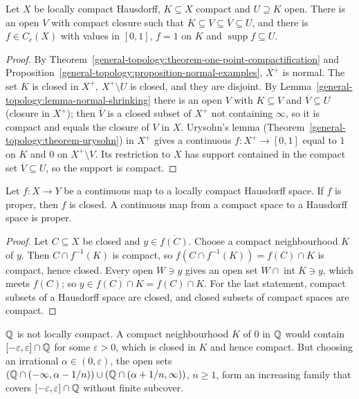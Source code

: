 \begin{lemma}\label{general-topology:lemma-lch-shrinking}
Let $X$ be locally compact Hausdorff, $K \subseteq X$ compact and $U \supseteq K$ open. There is an open $V$ with compact closure such that
$K \subseteq V \subseteq \overline{V} \subseteq U$, and there is $f \in C_c(X)$ with values in $[0, 1]$, $f = 1$ on $K$ and $\operatorname{supp} f \subseteq U$.
\end{lemma}

\begin{proof}
By Theorem~\ref{general-topology:theorem-one-point-compactification} and Proposition~\ref{general-topology:proposition-normal-examples}, $X^+$ is
normal. The set $K$ is closed in $X^+$, $X^+ \setminus U$ is closed, and they are disjoint. By Lemma~\ref{general-topology:lemma-normal-shrinking} there is an
open $V$ with $K \subseteq V$ and $\overline{V} \subseteq U$ (closure in $X^+$); then $\overline{V}$ is a closed subset of $X^+$ not containing $\infty$, so it
is compact and equals the closure of $V$ in $X$. Urysohn's lemma (Theorem~\ref{general-topology:theorem-urysohn}) in $X^+$ gives a continuous
$f \colon X^+ \to [0, 1]$ equal to $1$ on $K$ and $0$ on $X^+ \setminus V$. Its restriction to $X$ has support contained in the compact set $\overline{V} \subseteq U$,
so the support is compact.
\end{proof}

\begin{proposition}\label{general-topology:proposition-proper-closed}
Let $f \colon X \to Y$ be a continuous map to a locally compact Hausdorff space. If $f$ is proper, then $f$ is closed. A continuous map from a compact
space to a Hausdorff space is proper.
\end{proposition}

\begin{proof}
Let $C \subseteq X$ be closed and $y \in \overline{f(C)}$. Choose a compact neighbourhood $K$ of $y$. Then $C \cap f^{-1}(K)$ is compact, so
$f(C \cap f^{-1}(K)) = f(C) \cap K$ is compact, hence closed. Every open $W \ni y$ gives an open set $W \cap \operatorname{int} K \ni y$, which meets $f(C)$;
so $y \in \overline{f(C) \cap K} = f(C) \cap K$. For the last statement, compact subsets of a Hausdorff space are closed, and closed subsets of compact spaces are
compact.
\end{proof}

\begin{counterexample}\label{general-topology:counterexample-q-not-locally-compact}
$\mathbb{Q}$ is not locally compact. A compact neighbourhood $K$ of $0$ in $\mathbb{Q}$ would contain $[-\varepsilon, \varepsilon] \cap \mathbb{Q}$ for some $\varepsilon > 0$,
which is closed in $K$ and hence compact. But choosing an irrational $\alpha \in (0, \varepsilon)$, the open sets $(\mathbb{Q} \cap (-\infty, \alpha - 1/n)) \cup (\mathbb{Q} \cap (\alpha + 1/n, \infty))$, $n \geq 1$, form an increasing family that
covers $[-\varepsilon, \varepsilon] \cap \mathbb{Q}$ without finite subcover.
\end{counterexample}

